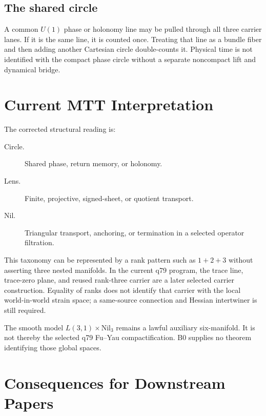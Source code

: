 \documentclass[11pt]{article}
\begin{document}
\subsection{The shared circle}

A common $U(1)$ phase or holonomy line may be pulled through all three carrier
lanes.  If it is the same line, it is counted once.  Treating that line as a
bundle fiber and then adding another Cartesian circle double-counts it.
Physical time is not identified with the compact phase circle without a
separate noncompact lift and dynamical bridge.

\section{Current MTT Interpretation}

The corrected structural reading is:
\begin{description}
\item[Circle.] Shared phase, return memory, or holonomy.
\item[Lens.] Finite, projective, signed-sheet, or quotient transport.
\item[Nil.] Triangular transport, anchoring, or termination in a selected
operator filtration.
\end{description}

This taxonomy can be represented by a rank pattern such as $1+2+3$ without
asserting three nested manifolds.  In the current q79 program, the trace line,
trace-zero plane, and reused rank-three carrier are a later selected carrier
construction.  Equality of ranks does not identify that carrier with the local
world-in-world strain space; a same-source connection and Hessian intertwiner
is still required.

The smooth model $L(3,1)\times\mathrm{Nil}_3$ remains a lawful auxiliary
six-manifold.  It is not thereby the selected q79 Fu--Yau compactification.
B0 supplies no theorem identifying those global spaces.

\section{Consequences for Downstream Papers}
\end{document}
